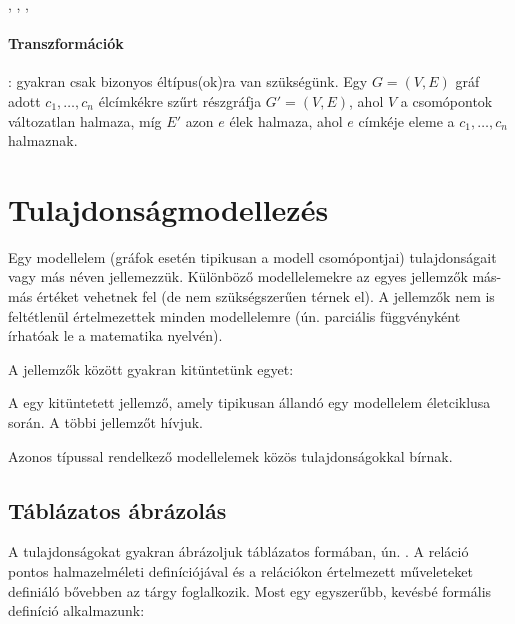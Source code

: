 , , , 


\paragraph{Transzformációk}

\begin{definicio}
: gyakran csak bizonyos éltípus(ok)ra van szükségünk. Egy $G = (V, E)$ gráf adott $c_1, \dots, c_n$ élcímkékre szűrt részgráfja $G' = (V, E)$, ahol $V$ a csomópontok változatlan halmaza, míg $E'$ azon $e$ élek halmaza, ahol $e$ címkéje eleme a $c_1, \dots, c_n$ halmaznak.
\end{definicio}



\section{Tulajdonságmodellezés}

Egy modellelem (gráfok esetén tipikusan a modell csomópontjai) tulajdonságait  vagy más néven  jellemezzük. Különböző modellelemekre az egyes jellemzők más-más értéket vehetnek fel (de nem szükségszerűen térnek el). A jellemzők nem is feltétlenül értelmezettek minden modellelemre (ún. parciális függvényként írhatóak le a matematika nyelvén).

A jellemzők között gyakran kitüntetünk egyet:

\begin{definicio}
A  egy kitüntetett jellemző, amely tipikusan állandó egy modellelem életciklusa során. A többi jellemzőt  hívjuk.
\end{definicio}

Azonos típussal rendelkező modellelemek közös tulajdonságokkal bírnak.

\subsection{Táblázatos ábrázolás}

A tulajdonságokat gyakran ábrázoljuk táblázatos formában, ún. . A reláció pontos halmazelméleti definíciójával és a relációkon értelmezett műveleteket definiáló  bővebben az \adatb tárgy foglalkozik. Most egy egyszerűbb, kevésbé formális definíció alkalmazunk:

